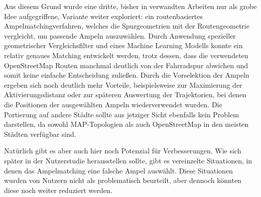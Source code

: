 Aus diesem Grund wurde eine dritte, bisher in verwandten Arbeiten nur als grobe Idee aufgegriffene, Variante weiter exploriert: ein routenbasiertes Ampelmatchingverfahren, welches die Spurgeometrien mit der Routengeometrie vergleicht, um passende Ampeln auszuwählen. Durch Anwendung spezieller geometrischer Vergleichsfilter und eines Machine Learning Modells konnte ein relativ genaues Matching entwickelt werden, trotz dessen, dass die verwendeten OpenStreetMap Routen manchmal deutlich von der Fahrradspur abwichen und somit keine einfache Entscheidung zuließen. Durch die Vorselektion der Ampeln ergeben sich noch deutlich mehr Vorteile, beispielsweise zur Maximierung der Aktivierungsdistanz oder zur späteren Auswertung der Trajektorien, bei denen die Positionen der ausgewählten Ampeln wiederverwendet wurden. Die Portierung auf andere Städte sollte aus jetziger Sicht ebenfalls kein Problem darstellen, da sowohl MAP-Topologien als auch OpenStreetMap in den meisten Städten verfügbar sind. 

Natürlich gibt es aber auch hier noch Potenzial für Verbesserungen. Wie sich später in der Nutzerstudie herausstellen sollte, gibt es vereinzelte Situationen, in denen das Ampelmatching eine falsche Ampel auswählt. Diese Situationen wurden von Nutzern nicht als problematisch beurteilt, aber dennoch könnten diese noch weiter reduziert werden.


